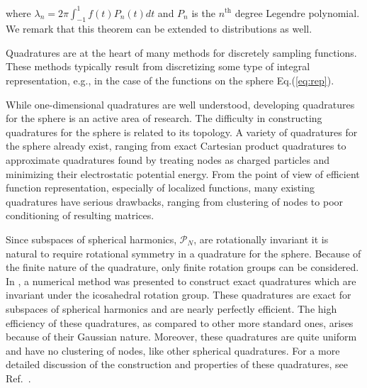 \documentclass[landscape,a0b,final]{a0poster}
\newcommand{\HH}{{\mathcal P}}
\newenvironment{poster}{
  \begin{center}
  \begin{minipage}[c]{0.98\textwidth}
}{
  \end{minipage} 
  \end{center}
}
\newcommand{\pbox}[4]{
\psshadowbox[#3]{
\begin{minipage}[t][#2][t]{#1}
#4
\end{minipage}
}}
\begin{document}
\begin{poster}
\begin{multicols}{3}
\begin{equation}
  \label{eq:funk-hecke}
\end{equation}
%
where $\lambda_n = 2\pi \int_{-1}^{1} f\left(t\right)P_n\left(t\right)dt$ and $P_n$ is the $n^{\mathrm{th}}$ degree Legendre polynomial. We remark that this theorem can be extended to distributions as well. 
%
\vspace{0.25cm}
\begin{center}\pbox{0.8\columnwidth}{}{linewidth=2mm,framearc=0.1,linecolor=lightblue,fillstyle=gradient,gradangle=0,gradbegin=white,gradend=whiteblue,gradmidpoint=1.0,framesep=1em}{\begin{center}Quadratures for the sphere\end{center}}\end{center}
\vspace{0.25cm}
Quadratures are at the heart of many methods for discretely sampling functions. These methods typically result from 
discretizing some type of integral representation, e.g., in the case of the functions on the sphere Eq.(\ref{eq:rep}). 

While one-dimensional quadratures are well understood, developing quadratures for the sphere is an active area of research. The difficulty in constructing quadratures for the sphere is related to its topology. A variety of quadratures for the sphere already exist, ranging from exact Cartesian product quadratures to approximate quadratures found by treating nodes as charged particles and minimizing their electrostatic potential energy. From the point of view of efficient function representation, especially of localized functions, many existing quadratures have serious drawbacks, ranging from clustering of nodes to poor conditioning of resulting matrices.

Since subspaces of spherical harmonics, $\HH_{N}$, are rotationally invariant it is natural to require rotational symmetry in a quadrature for the sphere. Because of the finite nature of the quadrature, only finite rotation groups can be considered. In \cite{AHR-BEY-2009}, a numerical method was presented to construct exact quadratures which are invariant under the icosahedral rotation group. These quadratures are exact for subspaces of spherical harmonics and are nearly perfectly efficient. The high efficiency of these quadratures, as compared to other more standard ones, arises because of their Gaussian nature. Moreover, these quadratures are quite uniform and have no clustering of nodes, like other spherical quadratures. For a more detailed discussion of the construction and properties of these quadratures, see Ref.~\cite{AHR-BEY-2009}. 


\end{multicols}
\end{poster}
\end{document}

